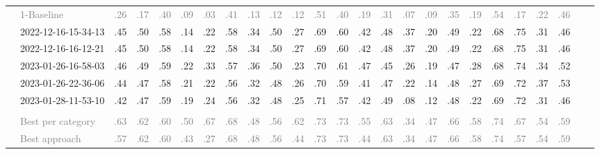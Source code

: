 \begin{table*}
\begin{tabular}{@{}ll@{\hspace{10pt}}c@{\hspace{5pt}}cccccccccccccccccccccc@{}}
& \textcolor{gray}{1-Baseline} & \textcolor{gray}{.26} & \textcolor{gray}{.17} & \textcolor{gray}{.40} & \textcolor{gray}{.09} & \textcolor{gray}{.03} & \textcolor{gray}{.41} & \textcolor{gray}{.13} & \textcolor{gray}{.12} & \textcolor{gray}{.12} & \textcolor{gray}{.51} & \textcolor{gray}{.40} & \textcolor{gray}{.19} & \textcolor{gray}{.31} & \textcolor{gray}{.07} & \textcolor{gray}{.09} & \textcolor{gray}{.35} & \textcolor{gray}{.19} & \textcolor{gray}{.54} & \textcolor{gray}{.17} & \textcolor{gray}{.22} & \textcolor{gray}{.46} \\
& 2022-12-16-15-34-13 & .45 & .50 & .58 & .14 & .22 & .58 & .34 & .50 & .27 & .69 & .60 & .42 & .48 & .37 & .20 & .49 & .22 & .68 & .75 & .31 & .46 \\
& 2022-12-16-16-12-21 & .45 & .50 & .58 & .14 & .22 & .58 & .34 & .50 & .27 & .69 & .60 & .42 & .48 & .37 & .20 & .49 & .22 & .68 & .75 & .31 & .46 \\
& 2023-01-26-16-58-03 & .46 & .49 & .59 & .22 & .33 & .57 & .36 & .50 & .23 & .70 & .61 & .47 & .45 & .26 & .19 & .47 & .28 & .68 & .74 & .34 & .52 \\
& 2023-01-26-22-36-06 & .44 & .47 & .58 & .21 & .22 & .56 & .32 & .48 & .26 & .70 & .59 & .41 & .47 & .22 & .14 & .48 & .27 & .69 & .72 & .37 & .53 \\
& 2023-01-28-11-53-10 & .42 & .47 & .59 & .19 & .24 & .56 & .32 & .48 & .25 & .71 & .57 & .42 & .49 & .08 & .12 & .48 & .22 & .69 & .72 & .31 & .46 \\
\addlinespace
\multicolumn{2}{@{}l}{\emph{Nahj al-Balagha}} \\
& \textcolor{gray}{Best per category} & \textcolor{gray}{.63} & \textcolor{gray}{.62} & \textcolor{gray}{.60} & \textcolor{gray}{.50} & \textcolor{gray}{.67} & \textcolor{gray}{.68} & \textcolor{gray}{.48} & \textcolor{gray}{.56} & \textcolor{gray}{.62} & \textcolor{gray}{.73} & \textcolor{gray}{.73} & \textcolor{gray}{.55} & \textcolor{gray}{.63} & \textcolor{gray}{.34} & \textcolor{gray}{.47} & \textcolor{gray}{.66} & \textcolor{gray}{.58} & \textcolor{gray}{.74} & \textcolor{gray}{.67} & \textcolor{gray}{.54} & \textcolor{gray}{.59} \\
& \textcolor{gray}{Best approach} & \textcolor{gray}{.57} & \textcolor{gray}{.62} & \textcolor{gray}{.60} & \textcolor{gray}{.43} & \textcolor{gray}{.27} & \textcolor{gray}{.68} & \textcolor{gray}{.48} & \textcolor{gray}{.56} & \textcolor{gray}{.44} & \textcolor{gray}{.73} & \textcolor{gray}{.73} & \textcolor{gray}{.44} & \textcolor{gray}{.63} & \textcolor{gray}{.34} & \textcolor{gray}{.47} & \textcolor{gray}{.66} & \textcolor{gray}{.58} & \textcolor{gray}{.74} & \textcolor{gray}{.57} & \textcolor{gray}{.54} & \textcolor{gray}{.59} \\

\end{tabular}
\end{table*}
